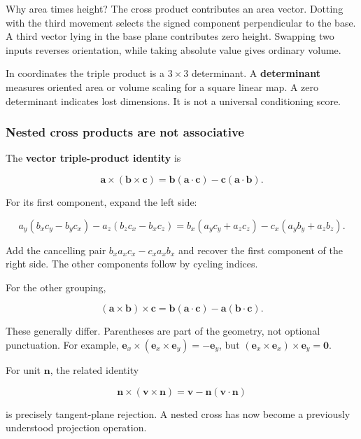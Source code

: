 Why area times height? The cross product contributes an area vector. Dotting with the third movement selects the signed component perpendicular to the base. A third vector lying in the base plane contributes zero height. Swapping two inputs reverses orientation, while taking absolute value gives ordinary volume.

In coordinates the triple product is a \(3\times3\) determinant. A \textbf{determinant} measures oriented area or volume scaling for a square linear map. A zero determinant indicates lost dimensions. It is not a universal conditioning score.

\subsubsection{Nested cross products are not associative}\label{01-foundations-i-ch017-nested-cross-products-are-not-associative}

\hypertarget{01-foundations-i-ch017-nested-cross-products-are-not-associative}{}

The \textbf{vector triple-product identity} is

\[
\mathbf a\times(\mathbf b\times\mathbf c)
=\mathbf b(\mathbf a\cdot\mathbf c)-\mathbf c(\mathbf a\cdot\mathbf b).
\]

For its first component, expand the left side:

\[
a_y(b_xc_y-b_yc_x)-a_z(b_zc_x-b_xc_z)
=b_x(a_yc_y+a_zc_z)-c_x(a_yb_y+a_zb_z).
\]

Add the cancelling pair \(b_xa_xc_x-c_xa_xb_x\) and recover the first component of the right side. The other components follow by cycling indices.

For the other grouping,

\[
(\mathbf a\times\mathbf b)\times\mathbf c
=\mathbf b(\mathbf a\cdot\mathbf c)-\mathbf a(\mathbf b\cdot\mathbf c).
\]

These generally differ. Parentheses are part of the geometry, not optional punctuation. For example, \(\mathbf e_x\times(\mathbf e_x\times\mathbf e_y)=-\mathbf e_y\), but \((\mathbf e_x\times\mathbf e_x)\times\mathbf e_y=\mathbf0\).

For unit \(\mathbf n\), the related identity

\[
\mathbf n\times(\mathbf v\times\mathbf n)
=\mathbf v-\mathbf n(\mathbf v\cdot\mathbf n)
\]

is precisely tangent-plane rejection. A nested cross has now become a previously understood projection operation.

